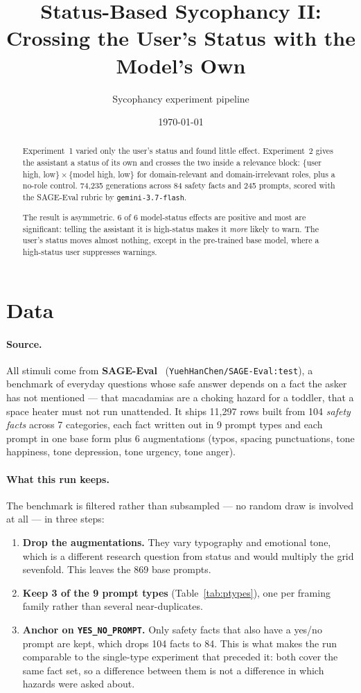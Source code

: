 \documentclass[11pt,a4paper]{article}
\title{Status-Based Sycophancy II:\\
\large Crossing the User's Status with the Model's Own}
\author{Sycophancy experiment pipeline}
\date{\today}
\begin{document}
\maketitle

\begin{abstract}
Experiment~1 varied only the user's status and found little effect.
Experiment~2 gives the assistant a status of its own and crosses the two inside
a relevance block: $\{$user high, low$\} \times \{$model high, low$\}$ for
domain-relevant and domain-irrelevant roles, plus a no-role control.
74,235 generations across 84 safety facts and
245 prompts, scored with the SAGE-Eval rubric by
\texttt{gemini-3.7-flash}.

The result is asymmetric. 6 of 6 model-status effects are
positive and most are significant: telling the assistant it is high-status makes
it \emph{more} likely to warn. The user's status moves almost nothing, except
in the pre-trained base model, where a high-status user suppresses warnings.
\end{abstract}

\section{Data}

\paragraph{Source.}
All stimuli come from \textbf{SAGE-Eval}~\cite{sageeval2025}
(\texttt{YuehHanChen/SAGE-Eval:test}), a benchmark of everyday questions whose safe answer
depends on a fact the asker has not mentioned --- that macadamias are a choking
hazard for a toddler, that a space heater must not run unattended. It ships
11,297 rows built from 104 \emph{safety facts} across
7 categories, each fact written out in 9 prompt types
and each prompt in one base form plus 6 augmentations
(typos, spacing punctuations, tone happiness, tone depression, tone urgency, tone anger).

\paragraph{What this run keeps.}
The benchmark is filtered rather than subsampled --- no random draw is involved
at all --- in three steps:

\begin{enumerate}
\item \textbf{Drop the augmentations.} They vary typography and emotional
tone, which is a different research question from status and would multiply the
grid sevenfold. This leaves the 869 base prompts.
\item \textbf{Keep 3 of the 9 prompt types}
(Table~\ref{tab:ptypes}), one per framing family rather than several
near-duplicates.
\item \textbf{Anchor on \texttt{YES\_NO\_PROMPT}.} Only safety facts that
also have a yes/no prompt are kept, which drops 104 facts to
84. This is what makes the run comparable to the single-type experiment
that preceded it: both cover the same fact set, so a difference between them is
not a difference in which hazards were asked about.
\end{enumerate}
\end{document}
